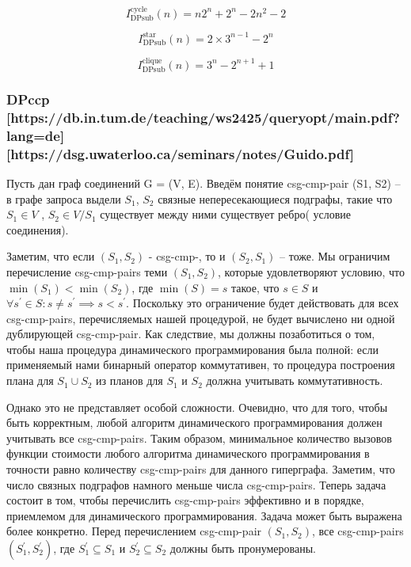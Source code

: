 \documentclass[12pt]{article}
\begin{document}
\begin{flushleft}
\[
I^{\text{cycle}}_{\text{DPsub}}(n) =
n2^{n} + 2^{n} - 2n^2 - 2
\]

\[
I^{\text{star}}_{\text{DPsub}}(n) =
2 \times 3^{n-1} - 2^{n}
\]

\[
I^{\text{clique}}_{\text{DPsub}}(n) =
3^n - 2^{n+1} + 1
\]

\centering \subsubsection*{DPccp [https://db.in.tum.de/teaching/ws2425/queryopt/main.pdf?lang=de][https://dsg.uwaterloo.ca/seminars/notes/Guido.pdf]}
\raggedright
Пусть дан граф соединений G = (V, E).
Введём понятие csg-cmp-pair (S1, S2) -- в графе запроса выдели $S_1$, 
$S_2$ связные непересекающиеся подграфы, такие что $S_1 \in V$ , 
$S_2 \in V/S_1$  существует между ними существует ребро( условие 
соединения).

Заметим, что если $(S_1, S_2)$ - csg-cmp-, то и $(S_2, S_1)$
-- тоже. Мы ограничим перечисление csg-cmp-pairs теми $(S_1, S_2)$, 
которые удовлетворяют условию, что $\min(S_1) < \min(S_2)$, 
где $\min(S) = s$ такое, что 
$s \in S$ и $\forall  s^{'} \in  S : s \neq s^{'} \implies  s < s^{'}$. 
Поскольку это ограничение будет действовать для всех csg-cmp-pairs, перечисляемых нашей процедурой, 
не будет вычислено ни одной дублирующей csg-cmp-pair. Как следствие, мы должны позаботиться о том, 
чтобы наша процедура динамического программирования была полной: если применяемый 
нами бинарный оператор коммутативен, то процедура построения плана для $ S_ 1 \cup S_2$ 
из планов для $S_1$ и $S_2$ должна учитывать коммутативность.

Однако это не представляет особой сложности. Очевидно, что для того, 
чтобы быть корректным, любой алгоритм динамического программирования 
должен учитывать все csg-cmp-pairs.  Таким образом, минимальное 
количество вызовов функции стоимости любого алгоритма динамического 
программирования в точности равно количеству csg-cmp-pairs для данного 
гиперграфа. Заметим, что число связных подграфов намного меньше числа 
csg-cmp-pairs. Теперь задача состоит в том, чтобы перечислить csg-cmp-pairs 
эффективно и в порядке, приемлемом для динамического программирования. 
Задача может быть выражена более конкретно. Перед перечислением csg-cmp-pair $(S_1, S_2)$, 
все csg-cmp-pairs $(S^{'}_1, S^{'}_2)$, где $S^{'}_1 \subseteq  S_1$ 
и $S^{'}_2 \subseteq  S_2$ должны быть пронумерованы.


\end{flushleft}
\end{document}
